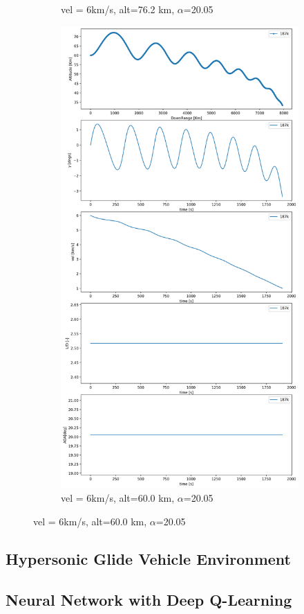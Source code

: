 \documentclass[11pt]{article} %
\begin{document}
\begin{figure}[hbt!]
\begin{subfigure}[b]{0.5\textwidth}
      \caption{ vel = 6km/s,  alt=76.2 km,   $\alpha$=20.05}
    \end{subfigure}
    \begin{subfigure}[b]{0.5\textwidth}
      \centering
      \includegraphics[width=\textwidth]{images/og2.png}
      \caption{ vel = 6km/s,  alt=60.0 km,   $\alpha$=20.05}
    \end{subfigure}
\end{figure}

\newpage
\subsection*{ Hypersonic Glide Vehicle Environment }
\lstset{style=mystyle}


\newpage
\subsection*{ Neural Network with Deep Q-Learning }
\lstset{style=mystyle}

\end{document}
